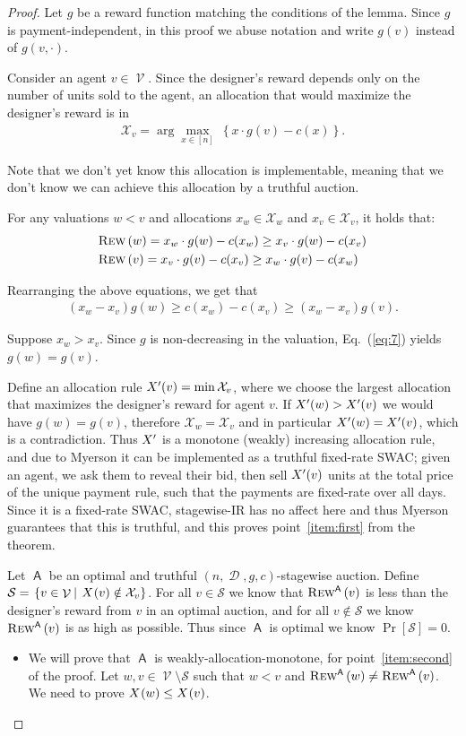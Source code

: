\documentclass[11pt,letterpaper]{article}
\newcommand{\set}[1]{\left\{#1\right\}}
\newcommand{\swir}{stagewise-IR\xspace}
\newcommand{\wamono}{weakly-allocation-monotone\xspace}
\newcommand{\fr}{fixed-rate\xspace}
\newcommand{\swac}{SWAC\xspace}
\newcommand \sett[2] { \left.\left\{{#1}\medspace\right\vert\medspace{#2}\right\}}
\newcommand{\sqrrange}[1]{[#1]}
\DeclareMathOperator{\A}{\auc{A}}
\DeclareMathOperator{\D}{\mathcal{D}}
\renewcommand{\S}{\mathcal{S}}
\DeclareMathOperator{\V}{\mathcal{V}}
\newcommand{\g}{g}
\newcommand{\argmax}[1]{\arg\underset{#1}{\max}\ }
\theoremstyle{plain}
\newcommand{\auc}[1]{\mathsf{#1}}
\begin{document}
\begin{proof}
    Let $\g$ be a reward function matching the conditions of the lemma. Since $\g$ is payment-independent, in this proof we abuse notation and write $\g(v)$ instead of $\g(v,\cdot)$.
    
    Consider an agent $v\in\V$. Since the designer's reward depends only on the number of units sold to the agent, an allocation that would maximize the designer's reward is in
    \begin{align}
        \mathcal{X}_v=\argmax{x\in\sqrrange{n}}\set{x\cdot\g(v)-c(x)}.
    \end{align}
    
    Note that we don't yet know this allocation is implementable, meaning that we don't know we can achieve this allocation by a truthful auction. 

    For any valuations $w<v$ and allocations $x_w\in\mathcal{X}_w$ and $x_v\in\mathcal{X}_v$, it holds that:
    \begin{align}
        &\trew{w}=x_w\cdot\g(w)-c(x_w)\geq x_v\cdot \g(w)-c(x_v)\label{eq:2}\\
        &\trew{v}= x_v\cdot \g(v)-c(x_v)\geq x_w\cdot\g(v)-c(x_w)\label{eq:1}
    \end{align}

    Rearranging the above equations, we get that 
    \begin{align}
        (x_w-x_v)\g(w)\geq c(x_w)-c(x_v) \geq (x_w-x_v)\g(v)\label{eq:7}.
    \end{align}

    Suppose $x_w>x_v$. Since $\g$ is non-decreasing in the valuation, Eq.~(\ref{eq:7}) yields $\g(w)=\g(v)$. 
    
    Define an allocation rule $\alloc'(v)=\min\mathcal{X}_v$, where we choose the largest allocation that maximizes the designer's reward for agent $v$. If $\alloc'(w)>\alloc'(v)$ we would have $\g(w)=\g(v)$, therefore $\mathcal{X}_w=\mathcal{X}_v$ and in particular $\alloc'(w)=\alloc'(v)$, which is a contradiction. Thus $\alloc'$ is a monotone (weakly) increasing allocation rule, and due to Myerson it can be implemented as a truthful \fr \swac; 
    given an agent, we ask them to reveal their bid, then sell $\alloc'(v)$ units at the total price of the unique payment rule, such that the payments are \fr over all days. Since it is a \fr \swac, \swir has no affect here and thus Myerson guarantees that this is truthful, and this proves point~\ref{item:first} from the theorem.

    Let $\A$ be an optimal and truthful $(n,\D,\g,c)$-stagewise auction.  Define $\S=\sett{v\in\V}{\x{v}\notin\mathcal{X}_v}$. For all $v\in\S$ we know that $\trew[\A]{v}$ is less than the designer's reward from $v$ in an optimal auction, and for all $v\notin\S$ we know $\trew[\A]{v}$ is as high as possible. Thus since $\A$ is optimal we know $\Pr[\S]=0$. 
    \begin{itemize}
        \item We will prove that $\A$ is \wamono, for point~\ref{item:second} of the proof. Let $w,v\in\V\setminus\S$ such that $w<v$ and $\trew[\A]{w}\neq \trew[\A]{v}$. We need to prove $\x{w}\leq\x{v}$.


\end{itemize}
\end{proof}
\end{document}
